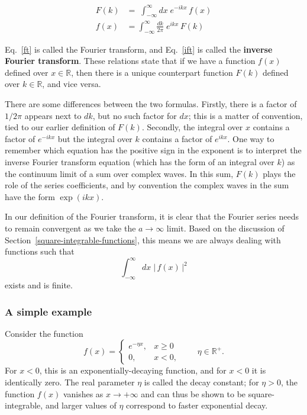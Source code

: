 \documentclass[10pt,a4paper]{article}
\begin{document}
\begin{framed}
  \begin{align}
    F(k) &= \;\int_{-\infty}^\infty dx\; e^{-ikx}\, f(x) \label{ft}\\
    f(x) &= \int_{-\infty}^\infty \frac{dk}{2\pi}\; e^{ikx}\, F(k) \label{ift}
  \end{align}
\end{framed}

\noindent
Eq.~\eqref{ft} is called the Fourier transform, and Eq.~\eqref{ift} is
called the \textbf{inverse Fourier transform}. These relations state
that if we have a function $f(x)$ defined over $x \in \mathbb{R}$,
then there is a unique counterpart function $F(k)$ defined over $k \in
\mathbb{R}$, and vice versa.

There are some differences between the two formulas. Firstly, there is
a factor of $1/2\pi$ appears next to $dk$, but no such factor for
$dx$; this is a matter of convention, tied to our earlier definition
of $F(k)$. Secondly, the integral over $x$ contains a factor of
$e^{-ikx}$ but the integral over $k$ contains a factor of
$e^{ikx}$. One way to remember which equation has the positive sign in
the exponent is to interpret the inverse Fourier transform equation
(which has the form of an integral over $k$) as the continuum limit of
a sum over complex waves. In this sum, $F(k)$ plays the role of the
series coefficients, and by convention the complex waves in the sum
have the form $\exp(ikx)$.

In our definition of the Fourier transform, it is clear that the
Fourier series needs to remain convergent as we take the $a
\rightarrow \infty$ limit. Based on the discussion of
Section~\ref{square-integrable-functions}, this means we are always
dealing with functions such that
\begin{equation}
\int_{-\infty}^{\infty} dx\; \big|\,f(x)\,\big|^2
\end{equation}
exists and is finite.

\subsubsection{A simple example}\label{a-simple-example}

Consider the function
\begin{equation}
f(x) = \left\{\begin{array}{cl}e^{-\eta x}, & x \ge 0 \\ 0, & x < 0,\end{array}\right. \qquad \eta \in \mathbb{R}^+.
\end{equation}
For $x < 0$, this is an exponentially-decaying function, and for
$x < 0$ it is identically zero. The real parameter $\eta$ is called
the decay constant; for $\eta > 0$, the function $f(x)$ vanishes as
$x \rightarrow +\infty$ and can thus be shown to be square-integrable,
and larger values of $\eta$ correspond to faster exponential decay.
\end{document}
